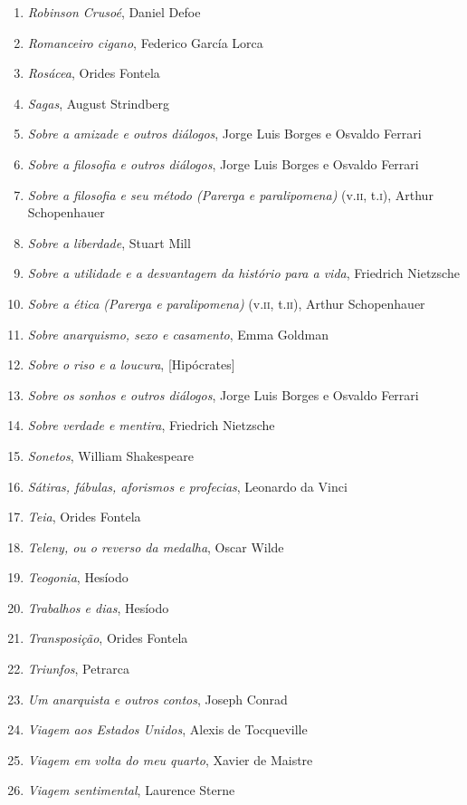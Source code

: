 \begin{enumerate}
\item \textit{Robinson Crusoé}, Daniel Defoe
\item \textit{Romanceiro cigano}, Federico García Lorca
\item \textit{Rosácea}, Orides Fontela
\item \textit{Sagas}, August Strindberg
\item \textit{Sobre a amizade e outros diálogos}, Jorge Luis Borges e Osvaldo Ferrari
\item \textit{Sobre a filosofia e outros diálogos}, Jorge Luis Borges e Osvaldo Ferrari
\item \textit{Sobre a filosofia e seu método (Parerga e paralipomena)} (v.\textsc{ii}, t.\textsc{i}), Arthur Schopenhauer 
\item \textit{Sobre a liberdade}, Stuart Mill
\item \textit{Sobre a utilidade e a desvantagem da histório para a vida}, Friedrich Nietzsche
\item \textit{Sobre a ética (Parerga e paralipomena)} (v.\textsc{ii}, t.\textsc{ii}), Arthur Schopenhauer 
\item \textit{Sobre anarquismo, sexo e casamento}, Emma Goldman
\item \textit{Sobre o riso e a loucura}, [Hipócrates]
\item \textit{Sobre os sonhos e outros diálogos}, Jorge Luis Borges e Osvaldo Ferrari
\item \textit{Sobre verdade e mentira}, Friedrich Nietzsche
\item \textit{Sonetos}, William Shakespeare
\item \textit{Sátiras, fábulas, aforismos e profecias}, Leonardo da Vinci
\item \textit{Teia}, Orides Fontela
\item \textit{Teleny, ou o reverso da medalha}, Oscar Wilde
\item \textit{Teogonia}, Hesíodo
\item \textit{Trabalhos e dias}, Hesíodo
\item \textit{Transposição}, Orides Fontela
\item \textit{Triunfos}, Petrarca
\item \textit{Um anarquista e outros contos}, Joseph Conrad
\item \textit{Viagem aos Estados Unidos}, Alexis de Tocqueville
\item \textit{Viagem em volta do meu quarto}, Xavier de Maistre 
\item \textit{Viagem sentimental}, Laurence Sterne
\end{enumerate}

